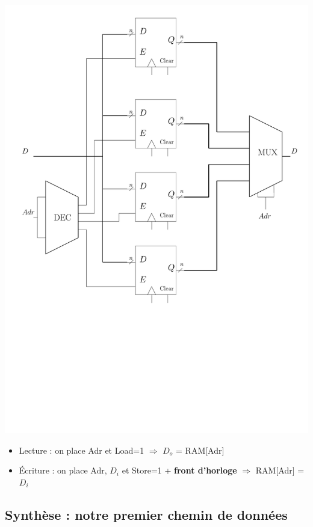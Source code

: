\documentclass{beamer}
\begin{document}
\begin{frame}
\begin{minipage}[c]{.4\linewidth}
\includegraphics[width=\columnwidth]{Figs/ram_inner.pdf}
\end{minipage}

\begin{itemize}
\item Lecture : on place Adr et Load=1 $\Rightarrow$ $D_o$ = RAM[Adr]
\item Écriture : on place Adr, $D_i$ et Store=1 + \textbf{front d'horloge} $\Rightarrow$ RAM[Adr] = $D_{i}$
\end{itemize}

\end{frame}



\subsection{Synthèse : notre premier chemin de données}
\end{document}

